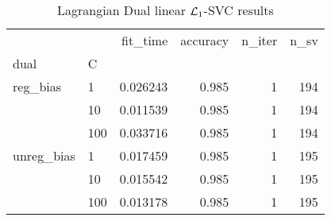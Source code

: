 \begin{table}[H]
\centering
\caption{Lagrangian Dual linear $\protect \mathcal{L}_1$-SVC results}
\label{linear_lagrangian_dual_l1_svc_cv_results}
\begin{tabular}{llrrrr}
\toprule
           &     &  fit\_time &  accuracy &  n\_iter &  n\_sv \\
dual & C &           &           &         &       \\
\midrule
reg\_bias & 1   &  0.026243 &     0.985 &       1 &   194 \\
           & 10  &  0.011539 &     0.985 &       1 &   194 \\
           & 100 &  0.033716 &     0.985 &       1 &   194 \\
unreg\_bias & 1   &  0.017459 &     0.985 &       1 &   195 \\
           & 10  &  0.015542 &     0.985 &       1 &   195 \\
           & 100 &  0.013178 &     0.985 &       1 &   195 \\
\bottomrule
\end{tabular}
\end{table}
